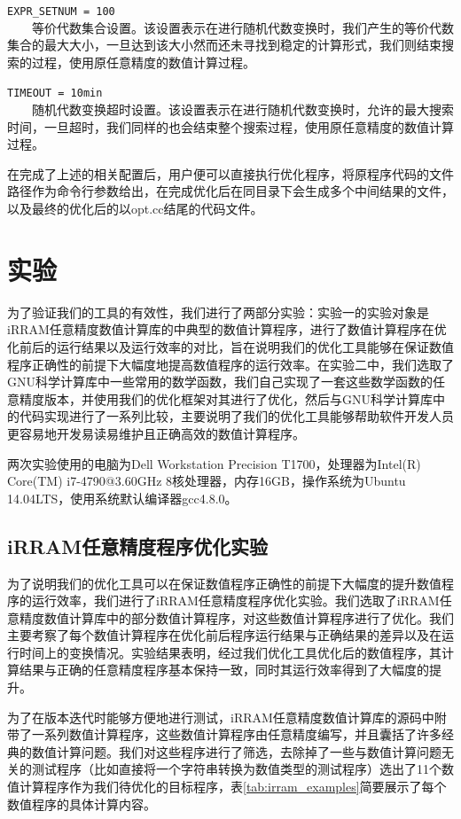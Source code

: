\texttt{EXPR\_SETNUM = 100}\\
　　等价代数集合设置。该设置表示在进行随机代数变换时，我们产生的等价代数集合的最大大小，一旦达到该大小然而还未寻找到稳定的计算形式，我们则结束搜索的过程，使用原任意精度的数值计算过程。

\texttt{TIMEOUT = 10min}\\
　　随机代数变换超时设置。该设置表示在进行随机代数变换时，允许的最大搜索时间，一旦超时，我们同样的也会结束整个搜索过程，使用原任意精度的数值计算过程。


在完成了上述的相关配置后，用户便可以直接执行优化程序，将原程序代码的文件路径作为命令行参数给出，在完成优化后在同目录下会生成多个中间结果的文件，以及最终的优化后的以opt.cc结尾的代码文件。

\section{实验}

为了验证我们的工具的有效性，我们进行了两部分实验：实验一的实验对象是iRRAM任意精度数值计算库的中典型的数值计算程序，进行了数值计算程序在优化前后的运行结果以及运行效率的对比，旨在说明我们的优化工具能够在保证数值程序正确性的前提下大幅度地提高数值程序的运行效率。在实验二中，我们选取了GNU科学计算库中一些常用的数学函数，我们自己实现了一套这些数学函数的任意精度版本，并使用我们的优化框架对其进行了优化，然后与GNU科学计算库中的代码实现进行了一系列比较，主要说明了我们的优化工具能够帮助软件开发人员更容易地开发易读易维护且正确高效的数值计算程序。

两次实验使用的电脑为Dell Workstation Precision T1700，处理器为Intel(R) Core(TM) i7-4790@3.60GHz 8核处理器，内存16GB，操作系统为Ubuntu 14.04LTS，使用系统默认编译器gcc4.8.0。

\subsection{iRRAM任意精度程序优化实验}

为了说明我们的优化工具可以在保证数值程序正确性的前提下大幅度的提升数值程序的运行效率，我们进行了iRRAM任意精度程序优化实验。我们选取了iRRAM任意精度数值计算库中的部分数值计算程序，对这些数值计算程序进行了优化。我们主要考察了每个数值计算程序在优化前后程序运行结果与正确结果的差异以及在运行时间上的变换情况。实验结果表明，经过我们优化工具优化后的数值程序，其计算结果与正确的任意精度程序基本保持一致，同时其运行效率得到了大幅度的提升。

为了在版本迭代时能够方便地进行测试，iRRAM任意精度数值计算库的源码中附带了一系列数值计算程序，这些数值计算程序由任意精度编写，并且囊括了许多经典的数值计算问题。我们对这些程序进行了筛选，去除掉了一些与数值计算问题无关的测试程序（比如直接将一个字符串转换为数值类型的测试程序）选出了11个数值计算程序作为我们待优化的目标程序，表\ref{tab:irram_examples}简要展示了每个数值程序的具体计算内容。

